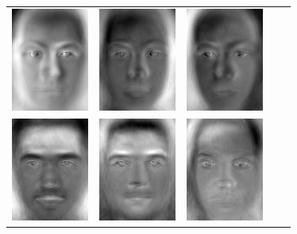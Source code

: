 \documentclass[12pt]{article}
\begin{document}
\begin{enumerate}
\begin{enumerate}
\begin{table}[H]
\begin{tabular}{ccccc}
\includegraphics[width=1in]{pca/2}&\includegraphics[width=1in]{pca/3}&
\includegraphics[width=1in]{pca/4}\\\includegraphics[width=1in]{pca/5}&
\includegraphics[width=1in]{pca/6}&\includegraphics[width=1in]{pca/7}&

\end{tabular}
\end{table}
\end{enumerate}
\end{enumerate}
\end{document}

